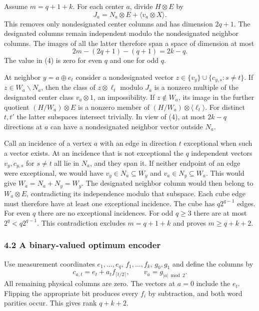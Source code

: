 \documentclass[
  10pt,
]{article}
\begin{document}
Assume \(m=q+1+k\). For each center \(a\), divide \(H\otimes E\) by \[
             J_a=N_a\otimes E+\langle v_a\otimes X\rangle.
\] This removes only nondesignated center columns and has dimension
\(2q+1\). The designated columns remain independent modulo the
nondesignated neighbor columns. The images of all the latter therefore
span a space of dimension at most \[
             2m-(2q+1)-(q+1)=2k-q.
 \tag{4}
\] The value in (4) is zero for even \(q\) and one for odd \(q\).

At neighbor \(y=a\oplus e_t\) consider a nondesignated vector
\(z\in\{v_y\}\cup\{c_{y,s}:s\ne t\}\). If \(z\in W_a\mathbin{\backslash}N_a\),
then the class of \(z\otimes\ell_t\) modulo \(J_a\) is a nonzero
multiple of the designated center class \(v_a\otimes1\), an
impossibility. If \(z\notin W_a\), its image in the further quotient
\((H/W_a)\otimes E\) is a nonzero member of
\((H/W_a)\otimes\langle\ell_t\rangle\). For distinct \(t,t'\) the latter
subspaces intersect trivially. In view of (4), at most \(2k-q\)
directions at \(a\) can have a nondesignated neighbor vector outside
\(N_a\).

Call an incidence of a vertex \(a\) with an edge in direction \(t\)
exceptional when such a vector exists. At an incidence that is not
exceptional the \(q\) independent vectors \(v_y,c_{y,s}\) for \(s\ne t\)
all lie in \(N_a\), and they span it. If neither endpoint of an edge
were exceptional, we would have \(v_y\in N_a\subseteq W_y\) and
\(v_a\in N_y\subseteq W_a\). This would give \(W_a=N_a+N_y=W_y\). The
designated neighbor column would then belong to \(W_a\otimes E\),
contradicting its independence modulo that subspace. Each cube edge must
therefore have at least one exceptional incidence. The cube has
\(q2^{q-1}\) edges. For even \(q\) there are no exceptional incidences.
For odd \(q\ge3\) there are at most \(2^q<q2^{q-1}\). This contradiction
excludes \(m=q+1+k\) and proves \(m\ge q+k+2\).

\subsubsection{4.2 A binary-valued optimum
encoder}\label{a-binary-valued-optimum-encoder}

Use measurement coordinates \(e_1,\ldots,e_q\), \(f_1,\ldots,f_k\),
\(g_0,g_1\) and define the columns by \[
        c_{a,t}=e_t+a_t f_{\lceil t/2\rceil},
        \qquad
        v_a=g_{|a|\bmod2}.
 \tag{5}
\] All remaining physical columns are zero. The vectors at \(a=0\)
include the \(e_t\). Flipping the appropriate bit produces every \(f_i\)
by subtraction, and both word parities occur. This gives rank \(q+k+2\).
\end{document}
